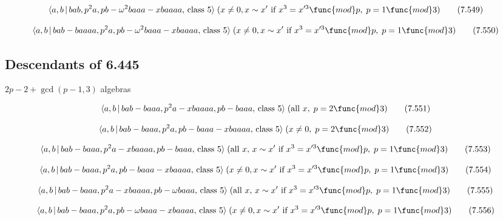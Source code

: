\documentclass[10pt]{article}
\begin{document}
\begin{equation}
\langle a,b\,|\,bab,p^{2}a,pb-\omega ^{2}baaa-xbaaaa,\,\text{class }5\rangle
\;(x\neq 0,x \sim x^{\prime }\text{ if }x^3=x^{\prime 3}\func{mod}p,\;p=1%
\func{mod}3)  \tag{7.549}
\end{equation}

\begin{equation}
\langle a,b\,|\,bab-baaaa,p^{2}a,pb-\omega ^{2}baaa-xbaaaa,\,\text{class }%
5\rangle \;(x\neq 0,x \sim x^{\prime }\text{ if }x^3=x^{\prime 3}\func{mod}%
p,\;p=1\func{mod}3)  \tag{7.550}
\end{equation}

\subsection{Descendants of 6.445}

$2p-2+\gcd (p-1,3)$ algebras

\begin{equation}
\langle a,b\,|\,bab-baaa,p^{2}a-xbaaaa,pb-baaa,\,\text{class }5\rangle \;(%
\text{all }x,\;p=2\func{mod}3)  \tag{7.551}
\end{equation}

\begin{equation}
\langle a,b\,|\,bab-baaa,p^2a,pb-baaa-xbaaaa,\,\text{class }5\rangle \;(x
\neq 0,\;p=2 \func{mod} 3)  \tag{7.552}
\end{equation}

\begin{equation}
\langle a,b\,|\,bab-baaa,p^{2}a-xbaaaa,pb-baaa,\,\text{class }5\rangle \;(%
\text{all }x,\,x \sim x^{\prime }\text{ if }x^3=x^{\prime 3}\func{mod}p,\;p=1%
\func{mod}3)  \tag{7.553}
\end{equation}

\begin{equation}
\langle a,b\,|\,bab-baaa,p^2a,pb-baaa-xbaaaa,\,\text{class }5\rangle \;(x
\neq 0, x \sim x^{\prime }\text{ if }x^3=x^{\prime 3 }\func{mod} p,\;p=1 
\func{mod} 3)  \tag{7.554}
\end{equation}

\begin{equation}
\langle a,b\,|\,bab-baaa,p^{2}a-xbaaaa,pb-\omega baaa,\,\text{class }%
5\rangle \;(\text{all }x,\,x \sim x^{\prime }\text{ if }x^3=x^{\prime 3}%
\func{mod}p,\;p=1\func{mod}3)  \tag{7.555}
\end{equation}

\begin{equation}
\langle a,b\,|\,bab-baaa,p^{2}a,pb-\omega baaa-xbaaaa,\,\text{class }%
5\rangle \;(x\neq 0,x \sim x^{\prime }\text{ if }x^3=x^{\prime 3}\func{mod}%
p,\;p=1\func{mod}3)  \tag{7.556}
\end{equation}
\end{document}
